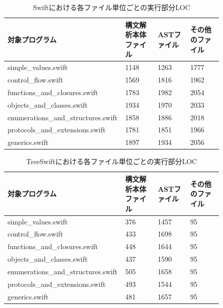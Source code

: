 \begin{table}[!hbtp]
    \begin{center}
        \caption{Swiftにおける各ファイル単位ごとの実行部分LOC}
        \begin{tabular}{|p{0.4\linewidth}|p{0.15\linewidth}|p{0.15\linewidth}|p{0.15\linewidth}|}
            \hline
            対象プログラム & 構文解析本体ファイル & ASTファイル & その他のファイル\\
            \hline
            \hline
            simple\_values.swift & 1148 & 1263 & 1777\\
            \hline
            control\_flow.swift & 1569 & 1816 & 1962\\
            \hline
            functions\_and\_closures.swift & 1783 & 1982 & 2054\\
            \hline
            objects\_and\_classes.swift & 1934 & 1970 & 2033\\
            \hline
            enumerations\_and\_structures.swift & 1858 & 1886 & 2018\\
            \hline
            protocols\_and\_extensions.swift & 1781 & 1851 & 1966\\
            \hline
            generics.swift & 1897 & 1934 & 2056\\
            \hline
        \end{tabular}
        \label{table:loc-swift-per-file}
    \end{center}
\end{table}

\begin{table}[!hbtp]
    \begin{center}
        \caption{TreeSwiftにおける各ファイル単位ごとの実行部分LOC}
        \begin{tabular}{|p{0.4\linewidth}|p{0.15\linewidth}|p{0.15\linewidth}|p{0.15\linewidth}|}
            \hline
            対象プログラム & 構文解析本体ファイル & ASTファイル & その他のファイル\\
            \hline
            \hline
            simple\_values.swift & 376 & 1457 & 95\\
            \hline
            control\_flow.swift & 433 & 1698 & 95\\
            \hline
            functions\_and\_closures.swift & 448 & 1644 & 95\\
            \hline
            objects\_and\_classes.swift & 437 & 1590 & 95\\
            \hline
            enumerations\_and\_structures.swift & 505 & 1658 & 95\\
            \hline
            protocols\_and\_extensions.swift & 493 & 1544 & 95\\
            \hline
            generics.swift & 481 & 1657 & 95\\
            \hline
        \end{tabular}
        \label{table:loc-treeswift-per-file}
    \end{center}
\end{table}

